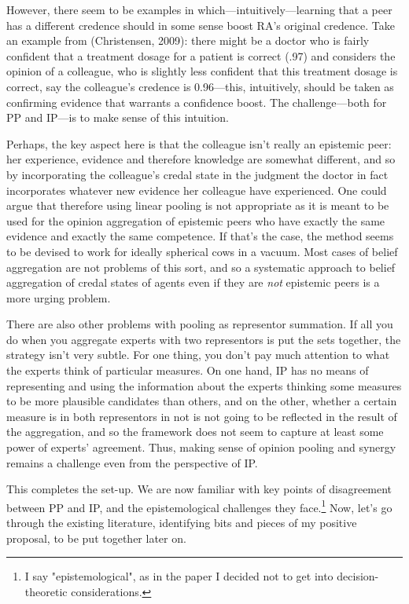 \documentclass[
  10pt,
  dvipsnames,enabledeprecatedfontcommands]{scrartcl}
\begin{document}
However, there seem to be examples in which---intuitively---learning
that a peer has a different credence should in some sense boost RA's
original credence. Take an example from (Christensen, 2009): there might
be a doctor who is fairly confident that a treatment dosage for a
patient is correct (.97) and considers the opinion of a colleague, who
is slightly less confident that this treatment dosage is correct, say
the colleague's credence is 0.96---this, intuitively, should be taken as
confirming evidence that warrants a confidence boost. The
challenge---both for PP and IP---is to make sense of this intuition.

Perhaps, the key aspect here is that the colleague isn't really an
epistemic peer: her experience, evidence and therefore knowledge are
somewhat different, and so by incorporating the colleague's credal state
in the judgment the doctor in fact incorporates whatever new evidence
her colleague have experienced. One could argue that therefore using
linear pooling is not appropriate as it is meant to be used for the
opinion aggregation of epistemic peers who have exactly the same
evidence and exactly the same competence. If that's the case, the method
seems to be devised to work for ideally spherical cows in a vacuum. Most
cases of belief aggregation are not problems of this sort, and so a
systematic approach to belief aggregation of credal states of agents
even if they are \emph{not} epistemic peers is a more urging problem.

There are also other problems with pooling as representor summation. If
all you do when you aggregate experts with two representors is put the
sets together, the strategy isn't very subtle. For one thing, you don't
pay much attention to what the experts think of particular measures. On
one hand, IP has no means of representing and using the information
about the experts thinking some measures to be more plausible candidates
than others, and on the other, whether a certain measure is in both
representors in not is not going to be reflected in the result of the
aggregation, and so the framework does not seem to capture at least some
power of experts' agreement. Thus, making sense of opinion pooling and
synergy remains a challenge even from the perspective of IP.

This completes the set-up. We are now familiar with key points of
disagreement between PP and IP, and the epistemological challenges they
face.\footnote{I say "epistemological", as in the paper I decided not to get into decision-theoretic considerations.}
Now, let's go through the existing literature, identifying bits and
pieces of my positive proposal, to be put together later on.
\end{document}
